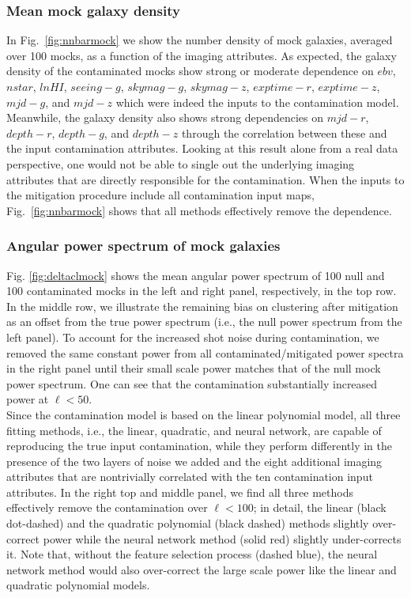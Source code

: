 \documentclass[fleqn, usenatbib]{mnras}
\begin{document}
\subsubsection{Mean mock galaxy density}
In Fig.~\ref{fig:nnbarmock} we show the number density of mock galaxies, averaged over 100 mocks, as a function of the imaging attributes. As expected, the galaxy density of the contaminated mocks show strong or moderate dependence on $ebv$, $nstar$, $lnHI$, $seeing-g$, $skymag-g$, $skymag-z$, $exptime-r$, $exptime-z$, $mjd-g$, and $mjd-z$ which were indeed the inputs to the contamination model. Meanwhile, the galaxy density also shows strong dependencies on $mjd-r$, $depth-r$, $depth-g$, and $depth-z$ through the correlation between these and the input contamination attributes. Looking at this result alone from a real data perspective, one would not be able to single out the underlying imaging attributes that are directly responsible for the contamination. When the inputs to the mitigation procedure include all contamination input maps, Fig.~\ref{fig:nnbarmock} shows that all methods effectively remove the dependence.\\
 

 
\subsubsection{Angular power spectrum of mock galaxies}
Fig. \ref{fig:deltaclmock} shows the mean angular power spectrum of 100 null and 100 contaminated mocks in the left and right panel, respectively, in the top row. In the middle row, we illustrate the remaining bias on clustering after mitigation as an offset from the true power spectrum (i.e., the null power spectrum from the left panel). To account for the increased shot noise during contamination, we removed the same constant power from all contaminated/mitigated power spectra in the right panel until their small scale power matches that of the null mock power spectrum. One can see that the contamination substantially increased power at $\ell < 50$.\\

Since the contamination model is based on the linear polynomial model, all three fitting methods, i.e., the linear, quadratic, and neural network, are capable of reproducing the true input contamination, while they perform differently in the presence of the two layers of noise we added and the eight additional imaging attributes that are nontrivially correlated with the ten contamination input attributes. In the right top and middle panel, we find all three methods effectively remove the contamination over $\ell <100$; in detail, the linear (black dot-dashed) and the quadratic polynomial (black dashed) methods slightly over-correct power while the neural network method (solid red) slightly under-corrects it. Note that, without the feature selection process (dashed blue), the neural network method would also over-correct the large scale power like the linear and quadratic polynomial models.\\
\end{document}
